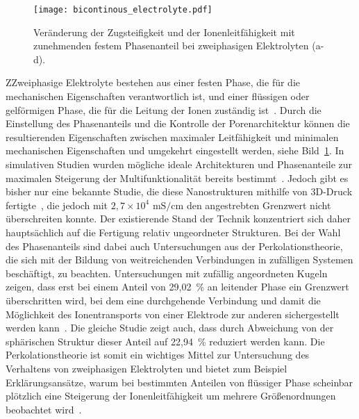 \begin{figure}[ht]
        \center
	\texttt{[image: bicontinous\_electrolyte.pdf]}
		\caption{\label{fig:bicontinous_electrolyte}Veränderung der Zugsteifigkeit und der Ionenleitfähigkeit mit zunehmenden festem Phasenanteil bei zweiphasigen Elektrolyten (a-d).}
\end{figure}
ZZweiphasige Elektrolyte bestehen aus einer festen Phase, die für die mechanischen Eigenschaften verantwortlich ist, und einer flüssigen oder gelförmigen Phase, die für die Leitung der Ionen zuständig ist~\cite{Ichino1995}. Durch die Einstellung des Phasenanteils und die Kontrolle der Porenarchitektur können die resultierenden Eigenschaften zwischen maximaler Leitfähigkeit und minimalen mechanischen Eigenschaften und umgekehrt eingestellt werden, siehe Bild~\ref{fig:bicontinous_electrolyte}. In simulativen Studien wurden mögliche ideale Architekturen und Phasenanteile zur maximalen Steigerung der Multifunktionalität bereits bestimmt~\cite{Lee2019,Tu2020}. Jedoch gibt es bisher nur eine bekannte Studie, die diese Nanostrukturen mithilfe von 3D-Druck fertigte~\cite{Zekoll2018}, die jedoch mit $2,7 \times 10^4$ $\si{\milli \siemens \per \cm}$ den angestrebten Grenzwert nicht überschreiten konnte. Der existierende Stand der Technik konzentriert sich daher hauptsächlich auf die Fertigung relativ ungeordneter Strukturen. Bei der Wahl des Phasenanteils sind dabei auch Untersuchungen aus der Perkolationstheorie, die sich mit der Bildung von weitreichenden Verbindungen in zufälligen Systemen beschäftigt, zu beachten. Untersuchungen mit zufällig angeordneten Kugeln zeigen, dass erst bei einem Anteil von 29,02~\% an leitender Phase ein Grenzwert überschritten wird, bei dem eine durchgehende Verbindung und damit die Möglichkeit des Ionentransports von einer Elektrode zur anderen sichergestellt werden kann~\cite{Li2020b}. Die gleiche Studie zeigt auch, dass durch Abweichung von der sphärischen Struktur dieser Anteil auf 22,94~\% reduziert werden kann. Die Perkolationstheorie ist somit ein wichtiges Mittel zur Untersuchung des Verhaltens von zweiphasigen Elektrolyten und bietet zum Beispiel Erklärungsansätze, warum bei bestimmten Anteilen von flüssiger Phase scheinbar plötzlich eine Steigerung der Ionenleitfähigkeit um mehrere Größenordnungen beobachtet wird~\cite{Melodia2023}.

